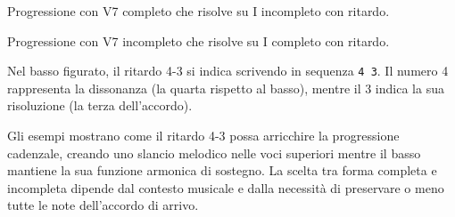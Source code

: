 \begin{esempio}
	\label{ex:ritardo_completo_minore}
	Progressione con V7 completo che risolve su I incompleto con ritardo.
	
\end{esempio}

\begin{esempio}
	\label{ex:ritardo_incompleto_minore}
	Progressione con V7 incompleto che risolve su I completo con ritardo.
	
\end{esempio}

\begin{regola}
	\label{reg:cifratura_ritardo}
	Nel basso figurato, il ritardo 4-3 si indica scrivendo in sequenza \texttt{4 3}. Il numero 4 rappresenta la dissonanza (la quarta rispetto al basso), mentre il 3 indica la sua risoluzione (la terza dell'accordo).
\end{regola}

Gli esempi mostrano come il ritardo 4-3 possa arricchire la progressione cadenzale, creando uno slancio melodico nelle voci superiori mentre il basso mantiene la sua funzione armonica di sostegno. La scelta tra forma completa e incompleta dipende dal contesto musicale e dalla necessità di preservare o meno tutte le note dell'accordo di arrivo.